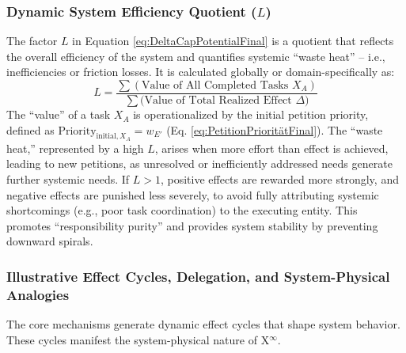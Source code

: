 \documentclass[12pt]{scrartcl}
\begin{document}
\subsubsection{Dynamic System Efficiency Quotient ($L$)}
\label{sec:LFinal}
The factor $L$ in Equation \eqref{eq:DeltaCapPotentialFinal} is a quotient that reflects the overall efficiency of the system and quantifies systemic “waste heat” – i.e., inefficiencies or friction losses. It is calculated globally or domain-specifically as:
\begin{equation}
L = \dfrac{\sum (\text{Value of All Completed Tasks } X_A)}{\sum (\text{Value of Total Realized Effect } \Delta\text{)}}
\label{eq:LFinal}
\end{equation}
The “value” of a task $X_A$ is operationalized by the initial petition priority, defined as $\text{Priority}_{\text{initial}, X_A} = w_{E'}$ (Eq. \eqref{eq:PetitionPrioritätFinal}). The “waste heat,” represented by a high $L$, arises when more effort than effect is achieved, leading to new petitions, as unresolved or inefficiently addressed needs generate further systemic needs. If $L > 1$, positive effects are rewarded more strongly, and negative effects are punished less severely, to avoid fully attributing systemic shortcomings (e.g., poor task coordination) to the executing entity. This promotes “responsibility purity” and provides system stability by preventing downward spirals.

\subsubsection{Illustrative Effect Cycles, Delegation, and System-Physical Analogies}
\label{sec:Wirkungskreislaeufe}
The core mechanisms generate dynamic effect cycles that shape system behavior. These cycles manifest the system-physical nature of X$^\infty$.
\end{document}
